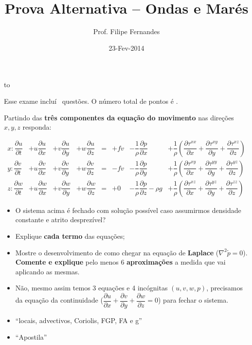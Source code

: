 \documentclass[letterpaper,portuguese,12pt,pdftex]{exam}
\title{Prova Alternativa -- Ondas e Marés}
\author{Prof. Filipe Fernandes}
\date{23-Fev-2014}
\newcommand{\pd}[2]{\dfrac{\partial #1}{\partial #2}}
\begin{document}
\maketitle
\doublespacing

\vspace{1cm}
\hbox to \textwidth{Nome e número de matrícula:\enspace\hrulefill}
\vspace{1cm}

\begin{minipage}{.8\textwidth}
Esse exame incluí \numquestions\ questões. O número total de pontos é \numpoints.
\end{minipage}

\begin{questions}

\question[8]
Partindo das {\bf três componentes da equação do movimento} nas direções
$x, y, z$ responda:

\begin{align*}
x: \pd{u}{t} &+ u\pd{u}{x} &+ v\pd{u}{y} &+ w\pd{u}{z} &= &+ fv &- \dfrac{1}{\rho}\pd{p}{x}         &+ \dfrac{1}{\rho}\left(\pd{\tau^{xx}}{x} + \pd{\tau^{xy}}{y} + \pd{\tau^{xz}}{z}\right) \\
y: \pd{v}{t} &+ u\pd{v}{x} &+ v\pd{v}{y} &+ w\pd{v}{z} &= &- fv &- \dfrac{1}{\rho}\pd{p}{y}         &+ \dfrac{1}{\rho}\left(\pd{\tau^{xy}}{x} + \pd{\tau^{yy}}{y} + \pd{\tau^{yz}}{z}\right) \\
z: \pd{w}{t} &+ u\pd{w}{x} &+ v\pd{w}{y} &+ w\pd{w}{z} &= &+  0 &- \dfrac{1}{\rho}\pd{p}{z} -\rho g &+ \dfrac{1}{\rho}\left(\pd{\tau^{xz}}{x} + \pd{\tau^{yz}}{y} + \pd{\tau^{zz}}{z}\right)
\end{align*}

\begin{itemize}
  \item O sistema acima é fechado com solução possível caso assumirmos
        densidade constante e atrito desprezível?
  \item Explique {\bf cada termo} das equações;
  \item Mostre o desenvolvimento de como chegar na equação de {\bf Laplace}
        ($\nabla^2 \tilde{p}= 0$).  {\bf Comente e explique} pelo menos 6
        {\bf aproximações} a medida que vai aplicando as mesmas.
\end{itemize}


\begin{solution}
  \begin{itemize}
    \item Não, mesmo assim temos 3 equações e 4 incógnitas $(u, v, w, p)$,
          precisamos da equação da continuidade
          ($\pd{u}{x} + \pd{v}{y} + \pd{w}{z} = 0$) para fechar o sistema.
    \item ``locais, advectivos, Coriolis, FGP, FA e g''
    \item ``Apostila''
  \end{itemize}
\end{solution}


\end{questions}
\end{document}
